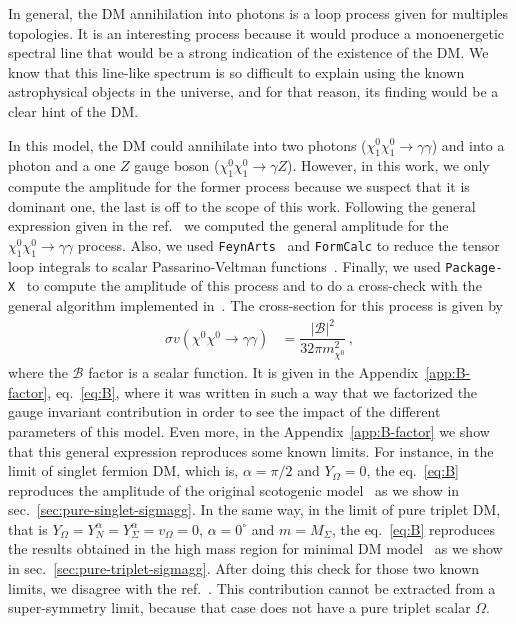 \documentclass[12pt,letterpaper]{article}
\begin{document}
In general, the DM annihilation into photons is a loop process given for multiples topologies. 
It is an interesting process because it would produce a monoenergetic spectral line that would be a strong indication of the existence of the DM. We know that this line-like spectrum is so difficult to explain using the known astrophysical objects in the universe, and for that reason, its finding would be a clear hint of the DM.
     
In this model, the DM could annihilate into two photons ($\chi_1^0\chi_1^0\rightarrow\gamma\gamma$) and into a photon and a one $Z$ gauge boson ($\chi_1^0\chi_1^0\rightarrow\gamma Z$). 
However, in this work, we only compute the amplitude for the former process because we suspect that it is dominant one, the last is off to the scope of this work.
%
Following the general expression given in the ref.~\cite{Garcia-Cely:2016hsk} we computed the general amplitude for the $\chi_1^0\chi_1^0\rightarrow\gamma\gamma$ process. 
Also, we used \texttt{FeynArts}~\cite{Hahn:2000kx} and \texttt{FormCalc} to reduce the tensor loop integrals to scalar Passarino-Veltman functions~\cite{Passarino:1978jh}. Finally, we used \texttt{Package-X}~\cite{Patel:2015tea} to compute the amplitude of this process and to do a cross-check with the general algorithm implemented in~\cite{Garcia-Cely:2016hsk}.
%
The cross-section for this process is given by
%
\begin{align}
\label{eq:sigmav-gg}
\sigma v (\chi^0\chi^0\rightarrow\gamma\gamma) &= \dfrac{|\mathcal{B}|^2}{32\pi m_{\chi^0}^2}\,,
\end{align}
%
where the $\mathcal{B}$ factor is a scalar function. It is given in the Appendix~\ref{app:B-factor}, eq.~\ref{eq:B}, where it was written in such a way that we factorized the gauge invariant contribution in order to see the impact of the different parameters of this model.
Even more, in the Appendix~\ref{app:B-factor} we show that this general expression reproduces some known limits. 
For instance, in the limit of singlet fermion DM, which is, $\alpha =\pi/2$ and $Y_{\Omega}=0$, the eq.~\ref{eq:B} reproduces the amplitude of the original scotogenic model~\cite{Garny:2015wea,Garcia-Cely:2016hsk} as we show in sec.~\ref{sec:pure-singlet-sigmagg}.
In the same way, in the limit of pure triplet DM, that is $Y_{\Omega}=Y_{N}^{\alpha}=Y_{\Sigma}^{\alpha}=v_{\Omega}=0$, $\alpha =0^{\circ}$ and $m=M_{\Sigma}$,  the eq.~\ref{eq:B} reproduces the results obtained in the high mass region for minimal DM model~\cite{Cirelli:2005uq} as we show in sec.~\ref{sec:pure-triplet-sigmagg}.
After doing this check for those two known limits, we disagree with the ref.~\cite{Choubey:2017yyn}. This contribution cannot be extracted from a super-symmetry limit, because that case does not have a pure triplet scalar $\Omega$.
\end{document}
